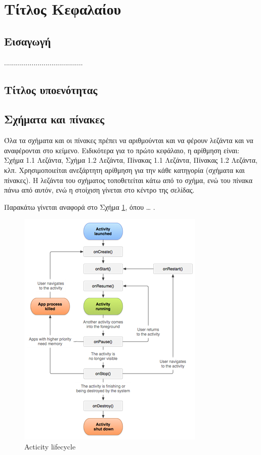 \documentclass[twoside, a4paper, 11pt]{article}
\begin{document}
\clearpage

\section{Τίτλος Κεφαλαίου}

\subsection{Εισαγωγή}

........................................

\subsection{Τίτλος υποενότητας}
\label{subsection:data-split}


\subsection{Σχήματα και πίνακες}
\label{subsection:rcpm1}
Όλα τα σχήματα και οι πίνακες πρέπει να αριθμούνται και να φέρουν λεζάντα και να αναφέρονται στο κείμενο. Ειδικότερα για το πρώτο κεφάλαιο, η αρίθμηση είναι: Σχήμα 1.1 Λεζάντα, Σχήμα 1.2 Λεζάντα, Πίνακας 1.1 Λεζάντα, Πίνακας 1.2 Λεζάντα, κλπ. Χρησιμοποιείται ανεξάρτητη αρίθμηση για την κάθε κατηγορία (σχήματα και πίνακες). Η λεζάντα του σχήματος τοποθετείται κάτω από το σχήμα, ενώ του πίνακα πάνω από αυτόν, ενώ η στοίχιση γίνεται στο κέντρο της σελίδας. 

Παρακάτω γίνεται αναφορά στο Σχήμα \ref{fig:activity-lifecycle}, όπου … .


\begin{figure}[!b]
\center
\includegraphics[scale=1]{Images/Figure-Example.png}
\caption{Acticity lifecycle}
\label{fig:activity-lifecycle}
\end{figure}
\end{document}
